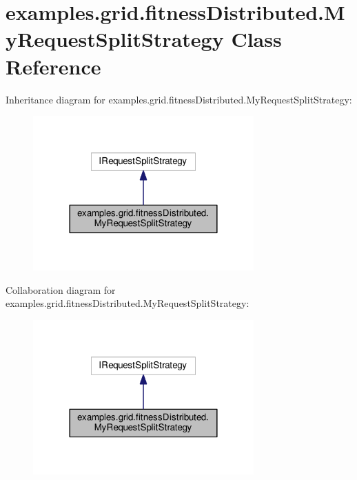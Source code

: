 \hypertarget{classexamples_1_1grid_1_1fitness_distributed_1_1_my_request_split_strategy}{\section{examples.\-grid.\-fitness\-Distributed.\-My\-Request\-Split\-Strategy Class Reference}
\label{classexamples_1_1grid_1_1fitness_distributed_1_1_my_request_split_strategy}
}


Inheritance diagram for examples.\-grid.\-fitness\-Distributed.\-My\-Request\-Split\-Strategy\-:
\nopagebreak
\begin{figure}[H]
\begin{center}
\leavevmode
\includegraphics[width=240pt]{classexamples_1_1grid_1_1fitness_distributed_1_1_my_request_split_strategy__inherit__graph}
\end{center}
\end{figure}


Collaboration diagram for examples.\-grid.\-fitness\-Distributed.\-My\-Request\-Split\-Strategy\-:
\nopagebreak
\begin{figure}[H]
\begin{center}
\leavevmode
\includegraphics[width=240pt]{classexamples_1_1grid_1_1fitness_distributed_1_1_my_request_split_strategy__coll__graph}
\end{center}
\end{figure}

